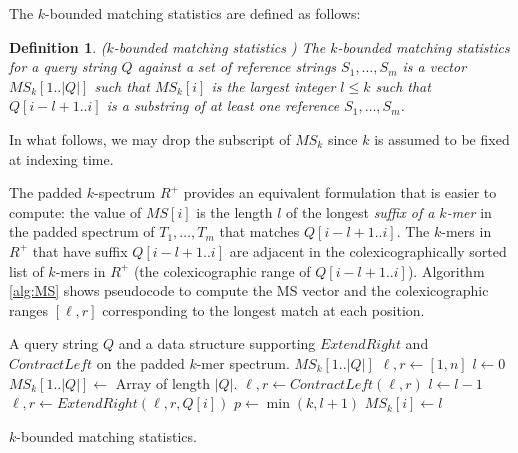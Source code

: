 \documentclass[unnumsec,webpdf,contemporary,large]{oup-authoring-template}%
\theoremstyle{thmstyleone}%
\theoremstyle{thmstyletwo}%
\theoremstyle{thmstylethree}%
\newtheorem{definition}{Definition}
\begin{document}
The $k$-bounded matching statistics are defined as follows:

\begin{definition}\label{def:k-bounded-ms}
    ($k$-bounded matching statistics \cite{alanko2024finimizers})
    The $k$-bounded matching statistics for a query string $Q$ against a set of reference strings $S_1, \ldots, S_m$ is a vector $MS_k[1..|Q|]$ such that $MS_k[i]$ is the largest integer $l \leq k$ such that $Q[i-l+1..i]$ %
    is a substring of at least one reference $S_1, \ldots, S_m$.
\end{definition}

In what follows, we may drop the subscript of $MS_k$ since $k$ is assumed to be fixed at indexing time.

The padded $k$-spectrum $R^+$ provides an equivalent formulation that is easier to compute: the value of $MS[i]$ is the length $l$ of the longest \emph{suffix of a $k$-mer} in the padded spectrum of $T_1, \ldots, T_m$ that matches $Q[i-l+1..i]$. The $k$-mers in $R^+$ that have suffix $Q[i-l+1..i]$ are adjacent in the colexicographically sorted list of $k$-mers in $R^+$ (the colexicographic range of $Q[i-l+1..i]$). Algorithm \ref{alg:MS} shows pseudocode to compute the MS vector and the colexicographic ranges $[\ell, r]$ corresponding to the longest match at each position.

\begin{algorithm}
\begin{algorithmic}[1]
\small
\Require A query string $Q$ and a data structure supporting $ExtendRight$ and $ContractLeft$ on the padded $k$-mer spectrum. %
\Ensure $MS_k[1..|Q|]$
\State $\ell, r \gets [1,n]$ 
\State $l \gets 0$ 
\State $MS_k[1..|Q|] \gets $ Array of length $|Q|$.
\label{line:MS-1-start}
    \State $\ell, r \gets ContractLeft(\ell, r)$
    \State $l \gets l-1$
\EndWhile \label{line:MS-1-end}
    \State $\ell, r \gets ExtendRight(\ell, r, Q[i])$\label{line:MS-2-start}
    \State $p \gets \min(k, l+1)$\label{line:MS-2-end}
\EndIf
\State $MS_k[i] \gets l$ %
\label{line:MS-4-assignment}
\EndFor
\caption{\small $k$-bounded matching statistics.} 
\label{alg:MS}
\end{algorithmic}
\end{algorithm}
\end{document}
